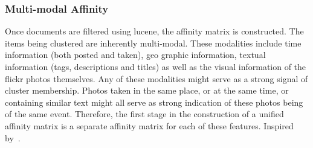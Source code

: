 \documentclass{../acm_proc_article-me11_tweaked}
\begin{document}
\subsubsection{Multi-modal Affinity} %
\label{ssub:multi_modal_affinity}
Once documents are filtered using lucene, the affinity matrix is constructed. The items being clustered are inherently multi-modal. These modalities include time information (both posted and taken), geo graphic information, textual information (tags, descriptions and titles) as well as the visual information of the flickr photos themselves. Any of these modalities might serve as a strong signal of cluster membership. Photos taken in the same place, or at the same time, or containing similar text might all serve as strong indication of these photos being of the same event. Therefore, the first stage in the construction of a unified affinity matrix is a separate affinity matrix for each of these features. Inspired by~\citet{Reuter2012ECS23247962324824}.










\end{document}
